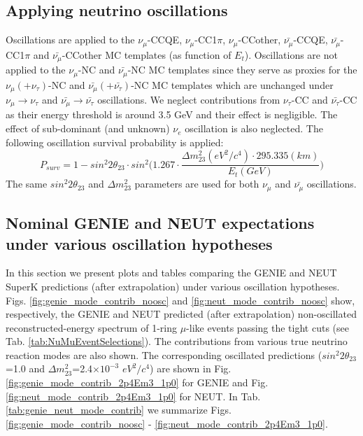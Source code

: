 \subsection{Applying neutrino oscillations}
\label{applying_oscillations}

Oscillations are applied to the 
$\nu_{\mu}$-CCQE, $\nu_{\mu}$-CC1$\pi$, $\nu_{\mu}$-CCother, 
$\bar{\nu_{\mu}}$-CCQE, $\bar{\nu_{\mu}}$-CC1$\pi$ and $\bar{\nu_{\mu}}$-CCother
MC templates (as function of $E_{t}$).
Oscillations are not applied to the $\nu_{\mu}$-NC and $\bar{\nu_{\mu}}$-NC MC templates
since they serve as proxies for the $\nu_{\mu}(+\nu_{\tau})$-NC and $\bar{\nu_{\mu}}(+\bar{\nu_{\tau}})$-NC MC templates
which are unchanged under 
$\nu_{\mu} \rightarrow \nu_{\tau}$ and 
$\bar{\nu_{\mu}} \rightarrow \bar{\nu_{\tau}}$ oscillations.
We neglect contributions from $\nu_{\tau}$-CC and $\bar{\nu_{\tau}}$-CC as their
energy threshold is around 3.5 GeV and their effect is negligible.
The effect of sub-dominant (and unknown) $\nu_{e}$ oscillation is also neglected.
The following oscillation survival probability is applied:
\begin{equation}
\displaystyle
  P_{surv} = 1 - sin^{2}{2\theta_{23}} \cdot 
                 sin^{2}\Big(
                  1.267 \cdot \frac{\Delta m^{2}_{23} (eV^{2}/c^{4}) \cdot 295.335 (km)}{E_{t} (GeV)}
                 \Big)
\label{eq:osc_formula}
\end{equation}
The same $sin^{2}{2\theta_{23}}$ and $\Delta m^{2}_{23}$ parameters 
are used for both $\nu_{\mu}$ and $\bar{\nu_{\mu}}$ oscillations.


%
%

\clearpage

\subsection{Nominal GENIE and NEUT expectations under various oscillation hypotheses}

In this section we present plots and tables comparing the GENIE and NEUT SuperK predictions
(after extrapolation) under various oscillation hypotheses.
Figs. \ref{fig:genie_mode_contrib_noosc} and \ref{fig:neut_mode_contrib_noosc} show,
respectively, the GENIE and NEUT
predicted (after extrapolation) non-oscillated reconstructed-energy spectrum of 1-ring $\mu$-like events 
passing the tight cuts (see Tab. \ref{tab:NuMuEventSelections}). 
The contributions from various true neutrino reaction modes are also shown. 
The corresponding oscillated predictions 
($sin^{2}2\theta_{23}$=1.0 and $\Delta m^{2}_{23}$=2.4$\times10^{-3}$ $eV^{2}/c^{4}$)
are shown in 
Fig. \ref{fig:genie_mode_contrib_2p4Em3_1p0} for GENIE and 
Fig. \ref{fig:neut_mode_contrib_2p4Em3_1p0} for NEUT.
In Tab. \ref{tab:genie_neut_mode_contrib} we summarize 
Figs. \ref{fig:genie_mode_contrib_noosc} - \ref{fig:neut_mode_contrib_2p4Em3_1p0}.

